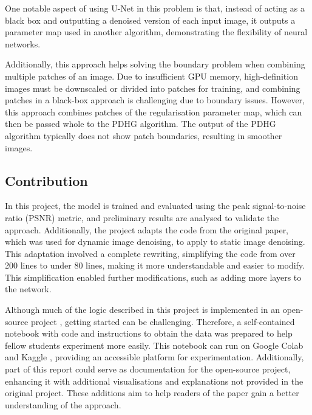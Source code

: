 \documentclass[12pt]{article}
\begin{document}

One notable aspect of using U-Net in this problem is that, instead of acting as a black box and outputting a denoised version of each input image, it outputs a parameter map used in another algorithm, demonstrating the flexibility of neural networks.

Additionally, this approach helps solving the boundary problem when combining multiple patches of an image. Due to insufficient GPU memory, high-definition images must be downscaled or divided into patches for training, and combining patches in a black-box approach is challenging due to boundary issues. However, this approach combines patches of the regularisation parameter map, which can then be passed whole to the PDHG algorithm. The output of the PDHG algorithm typically does not show patch boundaries, resulting in smoother images.



\subsection{Contribution}

In this project, the model is trained and evaluated using the peak signal-to-noise ratio (PSNR) metric, and preliminary results are analysed to validate the approach. Additionally, the project adapts the code from the original paper, which was used for dynamic image denoising, to apply to static image denoising. This adaptation involved a complete rewriting, simplifying the code from over 200 lines to under 80 lines, making it more understandable and easier to modify. This simplification enabled further modifications, such as adding more layers to the network.

Although much of the logic described in this project is implemented in an open-source project \cite{kofler2023learning}, getting started can be challenging. Therefore, a self-contained notebook with code and instructions to obtain the data was prepared to help fellow students experiment more easily. This notebook can run on Google Colab \cite{colab} and Kaggle \cite{kaggle}, providing an accessible platform for experimentation. Additionally, part of this report could serve as documentation for the open-source project, enhancing it with additional visualisations and explanations not provided in the original project. These additions aim to help readers of the paper gain a better understanding of the approach.
\end{document}
